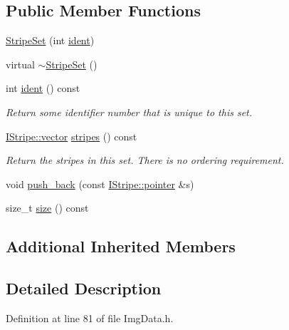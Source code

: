 \subsection*{Public Member Functions}
\begin{DoxyCompactItemize}
\item 
\hyperlink{class_wire_cell_1_1_img_1_1_data_1_1_stripe_set_a57ad9654607a4d81bfc6ed92fc370815}{Stripe\+Set} (int \hyperlink{class_wire_cell_1_1_img_1_1_data_1_1_stripe_set_a93cf81454aa5a3e7e5b89829a8ca44a1}{ident})
\item 
virtual \hyperlink{class_wire_cell_1_1_img_1_1_data_1_1_stripe_set_ae8b12060da956240ed586017ef1b5b45}{$\sim$\+Stripe\+Set} ()
\item 
int \hyperlink{class_wire_cell_1_1_img_1_1_data_1_1_stripe_set_a93cf81454aa5a3e7e5b89829a8ca44a1}{ident} () const
\begin{DoxyCompactList}\small\item\em Return some identifier number that is unique to this set. \end{DoxyCompactList}\item 
\hyperlink{class_wire_cell_1_1_i_data_ae1a9f863380499bb43f39fabb6276660}{I\+Stripe\+::vector} \hyperlink{class_wire_cell_1_1_img_1_1_data_1_1_stripe_set_aea07fe17999d5c62b2453d62cdc6fd05}{stripes} () const
\begin{DoxyCompactList}\small\item\em Return the stripes in this set. There is no ordering requirement. \end{DoxyCompactList}\item 
void \hyperlink{class_wire_cell_1_1_img_1_1_data_1_1_stripe_set_a8ab1bb80a351465a2b7edf6f86380371}{push\+\_\+back} (const \hyperlink{class_wire_cell_1_1_i_data_aff870b3ae8333cf9265941eef62498bc}{I\+Stripe\+::pointer} \&s)
\item 
size\+\_\+t \hyperlink{class_wire_cell_1_1_img_1_1_data_1_1_stripe_set_adcad4b6e98de85bb67c0543137c453c0}{size} () const
\end{DoxyCompactItemize}
\subsection*{Additional Inherited Members}


\subsection{Detailed Description}


Definition at line 81 of file Img\+Data.\+h.



